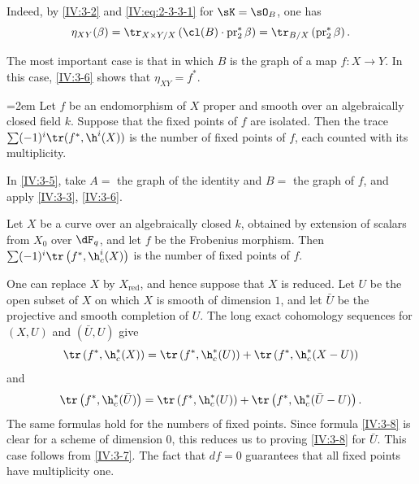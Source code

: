 Indeed, by \ref{IV:3-2} and \eqref{IV:eq:2-3-3-1} for $\sK=\sO_B$, one has
\[
  \eta_{X Y}(\beta) = \tr_{X\times Y/X}\left(\cl(B)\cdot \operatorname{pr}_2^\ast\beta\right) = \tr_{B/X}\left(\operatorname{pr}_2^\ast \beta\right) \text{.}
\]

The most important case is that in which $B$ is the graph of a map
$f:X\to Y$. In this case, \ref{IV:3-6} shows that $\eta_{X Y}=f^\ast$.






\begin{corollary_}\label{IV:3-7}
\begingroup
\emergencystretch=2em\relax
Let $f$ be an endomorphism of $X$ proper and smooth over an algebraically
closed field $k$. Suppose that the fixed points of $f$ are isolated. Then the
trace $\sum (-1)^i \tr(f^\ast,\h^i(X))$ is the number of fixed points of $f$,
each counted with its multiplicity.\par
\endgroup
\end{corollary_}

In \ref{IV:3-5}, take $A=$ the graph of the identity and $B=$ the graph of
$f$, and apply \ref{IV:3-3}, \ref{IV:3-6}.






\begin{corollary_}\label{IV:3-8}
Let $X$ be a curve over an algebraically closed $k$, obtained by extension of
scalars from $X_0$ over $\dF_q$, and let $f$ be the Frobenius morphism. Then
$\sum (-1)^i \tr\left(f^\ast,\h_c^i(X)\right)$ is the number of fixed
points of $f$.
\end{corollary_}

One can replace $X$ by $X_\text{red}$, and hence suppose that $X$ is reduced.
Let $U$ be the open subset of $X$ on which $X$ is smooth of dimension $1$,
and let $\bar U$ be the projective and smooth completion of $U$. The long exact
cohomology sequences for $(X,U)$ and $(\bar U,U)$ give
\[
  \tr\left(f^\ast,\h_c^*(X)\right) = \tr\left(f^\ast,\h_c^*(U)\right) + \tr\left(f^\ast,\h_c^*(X-U)\right)
\]
and
\[
  \tr\left(f^\ast,\h_c^*(\bar U)\right) = \tr\left(f^\ast,\h_c^*(U)\right) + \tr\left(f^\ast,\h_c^*(\bar U-U)\right) \text{.}
\]
The same formulas hold for the numbers of fixed points. Since formula
\ref{IV:3-8} is clear for a scheme of dimension $0$, this reduces us to
proving \ref{IV:3-8} for $\bar U$. This case follows from \ref{IV:3-7}. The
fact that $d f=0$ guarantees that all fixed points have multiplicity one.






